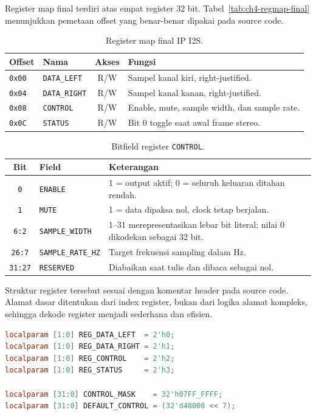 Register map final terdiri atas empat register 32 bit. Tabel~\ref{tab:ch4-regmap-final} menunjukkan pemetaan offset yang benar-benar dipakai pada source code.

\begin{table}[htbp]
\centering
\caption{Register map final IP I2S.}

\begin{tabular}{|l|l|c|p{7.5cm}|}
\hline
\textbf{Offset} & \textbf{Nama} & \textbf{Akses} & \textbf{Fungsi} \\
\hline
\texttt{0x00} & \texttt{DATA\_LEFT} & R/W & Sampel kanal kiri, right-justified. \\
\texttt{0x04} & \texttt{DATA\_RIGHT} & R/W & Sampel kanal kanan, right-justified. \\
\texttt{0x08} & \texttt{CONTROL} & R/W & Enable, mute, sample width, dan sample rate. \\
\texttt{0x0C} & \texttt{STATUS} & R/W & Bit 0 toggle saat awal frame stereo. \\
\hline
\end{tabular}
\end{table}

\begin{table}[htbp]
\centering
\caption{Bitfield register \texttt{CONTROL}.}

\begin{tabular}{|c|l|p{8.5cm}|}
\hline
\textbf{Bit} & \textbf{Field} & \textbf{Keterangan} \\
\hline
\texttt{0} & \texttt{ENABLE} & 1 = output aktif; 0 = seluruh keluaran ditahan rendah. \\
\texttt{1} & \texttt{MUTE} & 1 = data dipaksa nol, clock tetap berjalan. \\
\texttt{6:2} & \texttt{SAMPLE\_WIDTH} & 1--31 merepresentasikan lebar bit literal; nilai 0 dikodekan sebagai 32 bit. \\
\texttt{26:7} & \texttt{SAMPLE\_RATE\_HZ} & Target frekuensi sampling dalam Hz. \\
\texttt{31:27} & \texttt{RESERVED} & Diabaikan saat tulis dan dibaca sebagai nol. \\
\hline
\end{tabular}
\end{table}

Struktur register tersebut sesuai dengan komentar header pada source code. Alamat dasar ditentukan dari index register, bukan dari logika alamat kompleks, sehingga dekode register menjadi sederhana dan efisien.

\begin{lstlisting}[language=Verilog,caption={Deklarasi indeks register, mask baca, dan nilai default.},label={lst:ch4-reg-define}]
localparam [1:0] REG_DATA_LEFT  = 2'h0;
localparam [1:0] REG_DATA_RIGHT = 2'h1;
localparam [1:0] REG_CONTROL    = 2'h2;
localparam [1:0] REG_STATUS     = 2'h3;

localparam [31:0] CONTROL_MASK    = 32'h07FF_FFFF;
localparam [31:0] DEFAULT_CONTROL = (32'd48000 << 7);
\end{lstlisting}

